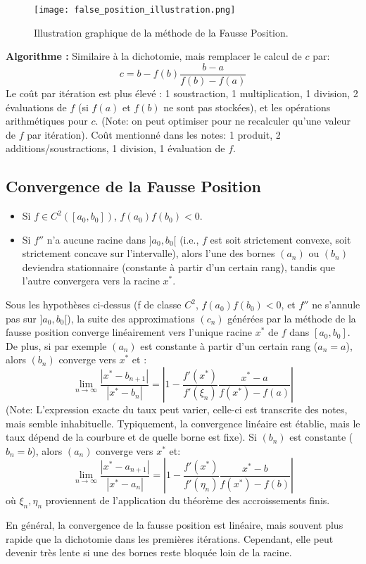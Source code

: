 \documentclass{article}
\begin{document}
\begin{figure}[H]
\centering
\texttt{[image: false\_position\_illustration.png]}
\caption{Illustration graphique de la méthode de la Fausse Position.}
\label{fig:fausse_position}
\end{figure}

\textbf{Algorithme :} Similaire à la dichotomie, mais remplacer le calcul de $c$ par:
\[ c = b - f(b) \frac{b - a}{f(b) - f(a)} \]
Le coût par itération est plus élevé : 1 soustraction, 1 multiplication, 1 division, 2 évaluations de $f$ (si $f(a)$ et $f(b)$ ne sont pas stockées), et les opérations arithmétiques pour $c$. (Note: on peut optimiser pour ne recalculer qu'une valeur de $f$ par itération). Coût mentionné dans les notes: 1 produit, 2 additions/soustractions, 1 division, 1 évaluation de $f$.

\subsection{Convergence de la Fausse Position} %
\begin{itemize}
    \item Si $f \in C^2([a_0, b_0])$, $f(a_0)f(b_0)<0$.
    \item Si $f''$ n'a aucune racine dans $]a_0, b_0[$ (i.e., $f$ est soit strictement convexe, soit strictement concave sur l'intervalle), alors l'une des bornes $(a_n)$ ou $(b_n)$ deviendra stationnaire (constante à partir d'un certain rang), tandis que l'autre convergera vers la racine $x^*$.
\end{itemize}

\begin{proposition}
Sous les hypothèses ci-dessus (f de classe $C^2$, $f(a_0)f(b_0)<0$, et $f''$ ne s'annule pas sur $]a_0, b_0[$), la suite des approximations $(c_n)$ générées par la méthode de la fausse position converge linéairement vers l'unique racine $x^*$ de $f$ dans $[a_0, b_0]$.
De plus, si par exemple $(a_n)$ est constante à partir d'un certain rang ($a_n=a$), alors $(b_n)$ converge vers $x^*$ et :
\[ \lim_{n \to \infty} \frac{|x^* - b_{n+1}|}{|x^* - b_n|} = \left| 1 - \frac{f'(x^*)}{f'( \xi_n)} \frac{x^*-a}{f(x^*)-f(a)} \right| \]
(Note: L'expression exacte du taux peut varier, celle-ci est transcrite des notes, mais semble inhabituelle. Typiquement, la convergence linéaire est établie, mais le taux dépend de la courbure et de quelle borne est fixe). Si $(b_n)$ est constante ($b_n=b$), alors $(a_n)$ converge vers $x^*$ et:
\[ \lim_{n \to \infty} \frac{|x^* - a_{n+1}|}{|x^* - a_n|} = \left| 1 - \frac{f'(x^*)}{f'( \eta_n)} \frac{x^*-b}{f(x^*)-f(b)} \right| \]
où $\xi_n, \eta_n$ proviennent de l'application du théorème des accroissements finis.
\end{proposition}

En général, la convergence de la fausse position est linéaire, mais souvent plus rapide que la dichotomie dans les premières itérations. Cependant, elle peut devenir très lente si une des bornes reste bloquée loin de la racine.
\end{document}
